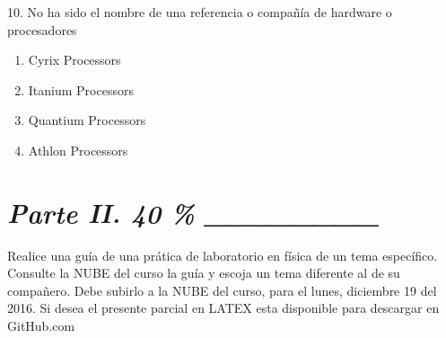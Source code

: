 \documentclass{article}
\begin{document}
10. No ha sido el nombre de una referencia o compañía de hardware o procesadores

\begin{enumerate}[label=(\Alph*)]
\item Cyrix Processors
\item Itanium Processors
\item Quantium Processors
\item Athlon Processors
\end{enumerate} 



\section{\textit{Parte II. 40 \% \_\_\_\_\_\_\_\_}}

Realice una guía de una prática de laboratorio en física de un tema específico. Consulte la NUBE del curso la guía y escoja un tema diferente al de su compañero. Debe subirlo a la NUBE del curso, para el lunes, diciembre 19 del 2016. Si desea el presente parcial en LATEX esta disponible para descargar en GitHub.com









\end{document}
